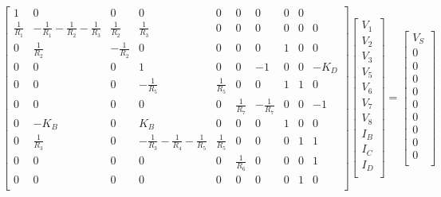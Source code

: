 \[
\begin{bmatrix}
1 & 0 & 0 & 0 & 0 & 0 & 0 & 0 & 0\\

\frac{1}{R_1} & -\frac{1}{R_1} -\frac{1}{R_2} -\frac{1}{R_3} & \frac{1}{R_2} & \frac{1}{R_3} & 0 & 0 & 0 & 0 & 0 & 0\\

0 & \frac{1}{R_2} & -\frac{1}{R_2} & 0 & 0 & 0 & 0 & 1 & 0 & 0\\

0 & 0 & 0 & 1 & 0 & 0 & -1 & 0 & 0 & -K_D\\

0 & 0 & 0 & -\frac{1}{R_5} & \frac{1}{R_5} & 0 & 0 & 1 & 1 & 0\\

0 & 0 & 0 & 0 & 0 & \frac{1}{R_7} & -\frac{1}{R_7} & 0 & 0 & -1\\

0 & -K_B & 0 & K_B & 0 & 0 & 0 & 1 & 0 & 0\\

0 & \frac{1}{R_3} & 0 & -\frac{1}{R_3}-\frac{1}{R_4}-\frac{1}{R_5} & \frac{1}{R_5} & 0 & 0 & 0 & 1 & 1\\

0 & 0 & 0 & 0 & 0 & \frac{1}{R_6} & 0 & 0 & 0 & 1\\

0 & 0 & 0 & 0 & 0 & 0 & 0 & 0 & 1 & 0 \\
\end{bmatrix}
\begin{bmatrix}
V_1\\
V_2\\
V_3\\
V_5\\
V_6\\
V_7\\
V_8\\
I_B\\
I_C\\
I_D\\
\end{bmatrix}
=
\begin{bmatrix}
V_S\\
0\\
0\\
0\\
0\\
0\\
0\\
0\\
0\\
0\\
\end{bmatrix}
\]

